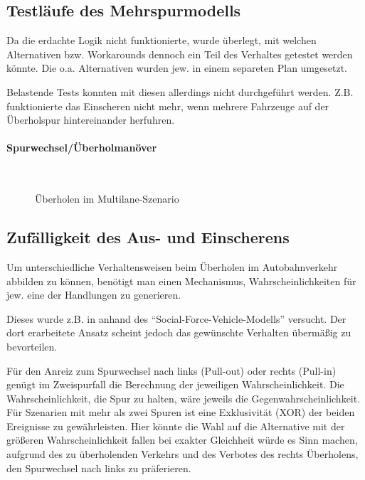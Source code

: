\subsection{Testläufe des Mehrspurmodells}
\label{test-multilane}

Da die erdachte Logik nicht funktionierte, wurde überlegt, mit welchen Alternativen bzw. Workarounds dennoch ein Teil des Verhaltes getestet werden könnte.
Die o.a. Alternativen wurden jew. in einem separeten Plan umgesetzt.

Belastende Tests konnten mit diesen allerdings nicht durchgeführt werden.
Z.B. funktionierte das Einscheren nicht mehr, wenn mehrere Fahrzeuge auf der Überholspur hintereinander herfuhren.

\paragraph*{Spurwechsel/Überholmanöver}
\hfill \\
\begin{figure}[hptb]
  \centering 
   \qquad 
   \qquad 
  \caption{Überholen im Multilane-Szenario} 
  \label{figure:multi-overtake}
\end{figure}





\subsection{Zufälligkeit des Aus- und Einscherens}
\label{sec:pullout-pullin}

Um unterschiedliche Verhaltensweisen beim Überholen im Autobahnverkehr abbilden zu können, benötigt man einen Mechanismus, Wahrscheinlichkeiten für jew. eine der Handlungen zu generieren.

Dieses wurde z.B. in \cite{dat-ba} anhand des \enquote{Social-Force-Vehicle-Modells} versucht. 
Der dort erarbeitete Ansatz scheint jedoch das gewünschte Verhalten übermäßig zu bevorteilen.

Für den Anreiz zum Spurwechsel nach links (Pull-out) oder rechts (Pull-in) genügt im Zweispurfall die Berechnung der jeweiligen Wahrscheinlichkeit.
Die Wahrscheinlichkeit, die Spur zu halten, wäre jeweils die Gegenwahrscheinlichkeit.
\\
Für Szenarien mit mehr als zwei Spuren ist eine Exklusivität (XOR) der beiden Ereignisse zu gewährleisten.
Hier könnte die Wahl auf die Alternative mit der größeren Wahrscheinlichkeit fallen bei exakter Gleichheit würde es Sinn machen, aufgrund des zu überholenden Verkehrs und des Verbotes des rechts Überholens, den Spurwechsel nach links zu präferieren.


